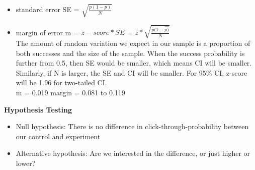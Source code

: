 \documentclass[10pt]{article}
\theoremstyle{definition}
\begin{document}
\begin{itemize}
\begin{shaded}
\begin{itemize}
        \item standard error SE = $\sqrt{\frac{p(1-p)}{N}}$
        \item margin of error m = $z-score * SE$ = $z * \sqrt{\frac{\hat{p}(1-\hat{p)}}{N}}$ \\
        The amount of random variation we expect in our sample is a proportion of both successes and the size of the sample. When the success probability is further from 0.5, then SE would be smaller, which means CI will be smaller. \\
        Similarly, if N is larger, the SE and CI will be smaller. 
        For 95$\%$ CI, z-score will be 1.96 for two-tailed CI.\\
        m = 0.019
        margin = 0.081 to 0.119 
    \end{itemize}
    \end{shaded}
    \begin{shaded}
    \item \textbf{Hypothesis Testing}
    \begin{itemize}
        \item Null hypothesis: There is no difference in click-through-probability between our control and experiment
        \item Alternative hypothesis: Are we interested in the difference, or just higher or lower?
    \end{itemize}
    \end{shaded}
\end{itemize}
\end{document}
